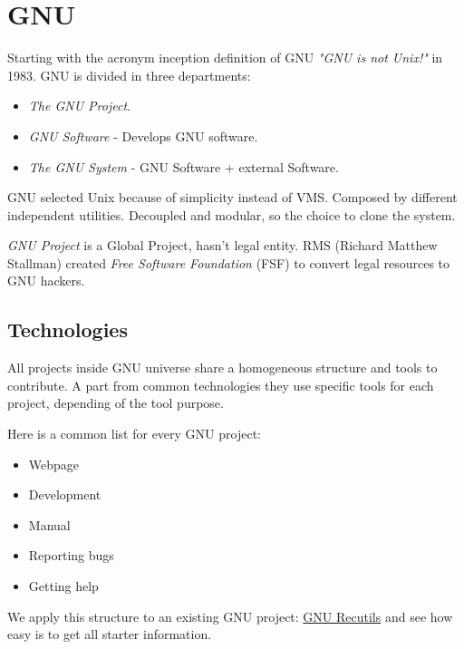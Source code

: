 \section{GNU}
\label{sec:gnu}

Starting with the acronym inception definition of GNU \textit{"GNU is not Unix!"} in 1983. GNU is divided in three departments:
\begin{itemize}
	\item \textit{The GNU Project}.
	\item \textit{GNU Software} - Develops GNU software.
	\item \textit{The GNU System} - GNU Software + external Software.
\end{itemize}

\par GNU selected Unix because of simplicity instead of VMS. Composed by different independent utilities. Decoupled and modular, so the choice to clone the system.

\par \textit{GNU Project} is a Global Project, hasn’t legal entity. RMS (Richard Matthew Stallman) created \textit{Free Software Foundation} (FSF) to convert legal resources to GNU hackers.

\subsection{Technologies}

\par All projects inside GNU universe share a homogeneous structure and tools to contribute. A part from common technologies they use specific tools for each project, depending of the tool purpose.

\par Here is a common list for every GNU project:

\begin{itemize}
	\item Webpage
	\item Development
	\item Manual
	\item Reporting bugs
	\item Getting help
\end{itemize}

\par We apply this structure to an existing GNU project: \href{http://www.gnu.org/software/recutils/}{GNU Recutils} and see how easy is to get all starter information.

